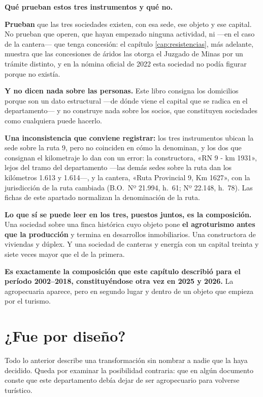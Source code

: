 \begin{cautela}
\textbf{Qué prueban estos tres instrumentos y qué no.}

\textbf{Prueban} que las tres sociedades existen, con esa sede, ese objeto y ese capital. No
prueban que operen, que hayan empezado ninguna actividad, ni ---en el caso de la cantera---
que tenga concesión: el capítulo \ref{cap:resistencias}, más adelante, muestra que las concesiones de áridos
las otorga el Juzgado de Minas por un trámite distinto, y en la nómina oficial de 2022 esta
sociedad no podía figurar porque no existía.

\textbf{Y no dicen nada sobre las personas.} Este libro consigna los domicilios porque son un
dato estructural ---de dónde viene el capital que se radica en el departamento--- y no
construye nada sobre los socios, que constituyen sociedades como cualquiera puede hacerlo.

\textbf{Una inconsistencia que conviene registrar:} los tres instrumentos ubican la sede sobre la ruta 9, pero no coinciden en cómo la denominan, y los dos que consignan el kilometraje lo dan con un error: la constructora, «RN 9 - km 1931», lejos del tramo del departamento ---las demás sedes sobre la ruta dan los kilómetros 1.613 y 1.614---, y la cantera, «Ruta Provincial 9, Km 1627», con la jurisdicción de la ruta cambiada (B.O.\ Nº 21.994, h.\ 61; Nº 22.148, h.\ 78). Las fichas de este apartado normalizan la denominación de la ruta.
\end{cautela}

\textbf{Lo que sí se puede leer en los tres, puestos juntos, es la composición.} Una sociedad
sobre una finca histórica cuyo objeto pone \textbf{el agroturismo antes que la producción} y
termina en desarrollos inmobiliarios. Una constructora de viviendas y dúplex. Y una sociedad de
canteras y energía con un capital treinta y siete veces mayor que el de la primera.

\textbf{Es exactamente la composición que este capítulo describió para el período
2002--2018, constituyéndose otra vez en 2025 y 2026.} La agropecuaria aparece, pero en segundo
lugar y dentro de un objeto que empieza por el turismo.

\section{¿Fue por diseño?}

Todo lo anterior describe una transformación sin nombrar a nadie que la haya decidido. Queda
por examinar la posibilidad contraria: que en algún documento conste que este departamento
debía dejar de ser agropecuario para volverse turístico.

